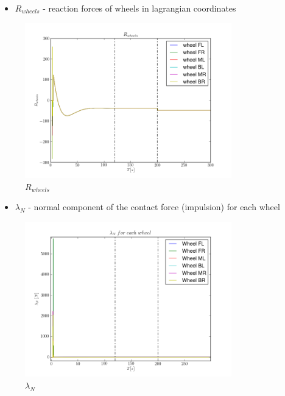 \begin{itemize}
  \item $R_{wheels}$ - reaction forces of wheels in lagrangian coordinates
\end{itemize}

\begin{figure}[H]
  \centering
    \includegraphics[width=0.8\textwidth]{pWHEELS5}
  \caption{$R_{wheels}$}
\end{figure}

\begin{itemize}
  \item $\lambda_{N}$ - normal component of the contact force (impulsion) for each wheel
\end{itemize}

\begin{figure}[H]
  \centering
    \includegraphics[width=0.8\textwidth]{lambdaN5}
  \caption{$\lambda_N$}
\end{figure}

